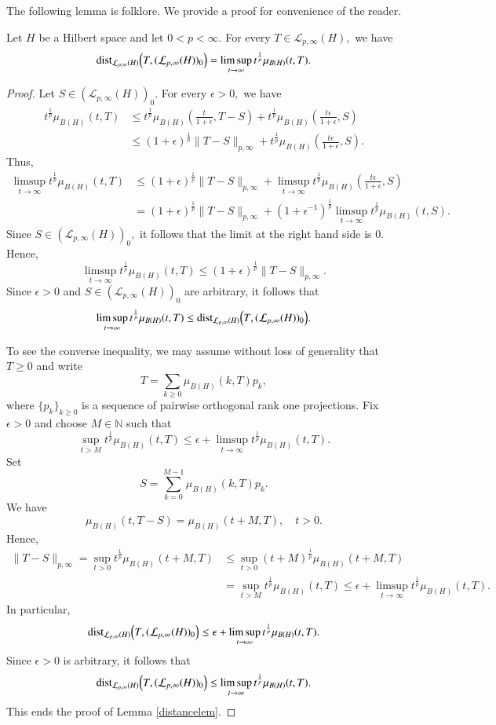 \documentclass[12pt]{amsart}
\begin{document}
{\color{blue} The following lemma is folklore. We provide a proof for convenience of the reader.

\begin{lemma}\label{distancelem}
Let $H$ be a Hilbert space and let $0<p<\infty.$ For every $T\in \mathcal{L}_{p,\infty}(H),$ we have
$${\rm dist}_{\mathcal{L}_{p,\infty}(H)}\Big(T,(\mathcal{L}_{p,\infty}(H))_0\Big)=\limsup_{t\to\infty}t^{\frac1{p}}\mu_{B(H)}(t,T).$$
\end{lemma}
\begin{proof} Let $S\in(\mathcal{L}_{p,\infty}(H))_0.$ For every $\epsilon>0,$ we have
\begin{align*}
t^{\frac1p}\mu_{B(H)}(t,T)&\leq t^{\frac1p}\mu_{B(H)}(\frac{t}{1+\epsilon},T-S)+t^{\frac1p}\mu_{B(H)}(\frac{t\epsilon}{1+\epsilon},S)\\
&\leq(1+\epsilon)^{\frac1p}\|T-S\|_{p,\infty}+t^{\frac1p}\mu_{B(H)}(\frac{t\epsilon}{1+\epsilon},S).
\end{align*}
Thus,
\begin{align*}
\limsup_{t\to\infty}t^{\frac1{p}}\mu_{B(H)}(t,T)&\leq (1+\epsilon)^{\frac1p}\|T-S\|_{p,\infty}+\limsup_{t\to\infty}t^{\frac1p}\mu_{B(H)}(\frac{t\epsilon}{1+\epsilon},S)\\
&=(1+\epsilon)^{\frac1p}\|T-S\|_{p,\infty}+(1+\epsilon^{-1})^{\frac1p}\limsup_{t\to\infty}t^{\frac1p}\mu_{B(H)}(t,S).
\end{align*}
Since $S\in (\mathcal{L}_{p,\infty}(H))_0,$ it follows that the limit at the right hand side is $0.$ Hence,
$$\limsup_{t\to\infty}t^{\frac1{p}}\mu_{B(H)}(t,T)\leq(1+\epsilon)^{\frac1p}\|T-S\|_{p,\infty}.$$
Since $\epsilon>0$ and $S\in (\mathcal{L}_{p,\infty}(H))_0$ are arbitrary, it follows that
$$\limsup_{t\to\infty}t^{\frac1{p}}\mu_{B(H)}(t,T)\leq {\rm dist}_{\mathcal{L}_{p,\infty}(H)}\Big(T,(\mathcal{L}_{p,\infty}(H))_0\Big).$$

To see the converse inequality, we may assume without loss of generality that $T\geq0$ and write
$$T=\sum_{k\geq0}\mu_{B(H)}(k,T)p_k,$$
where $\{p_k\}_{k\geq0}$ is a sequence of pairwise orthogonal rank one projections. Fix $\epsilon>0$ and choose $M\in\mathbb{N}$ such that
$$\sup_{t>M}t^{\frac1p}\mu_{B(H)}(t,T)\leq\epsilon+\limsup_{t\to\infty}t^{\frac1{p}}\mu_{B(H)}(t,T).$$
Set
$$S=\sum_{k=0}^{M-1}\mu_{B(H)}(k,T)p_k.$$
We have
$$\mu_{B(H)}(t,T-S)=\mu_{B(H)}(t+M,T),\quad t>0.$$
Hence,
\begin{align*}
\|T-S\|_{p,\infty}=\sup_{t>0}t^{\frac1p}\mu_{B(H)}(t+M,T)&\leq \sup_{t>0}(t+M)^{\frac1p}\mu_{B(H)}(t+M,T)\\
&=\sup_{t>M}t^{\frac1p}\mu_{B(H)}(t,T)\leq\epsilon+\limsup_{t\to\infty}t^{\frac1{p}}\mu_{B(H)}(t,T).
\end{align*}
In particular,
$${\rm dist}_{\mathcal{L}_{p,\infty}(H)}\Big(T,(\mathcal{L}_{p,\infty}(H))_0\Big)\leq \epsilon+\limsup_{t\to\infty}t^{\frac1{p}}\mu_{B(H)}(t,T).$$
Since $\epsilon>0$ is arbitrary, it follows that
$${\rm dist}_{\mathcal{L}_{p,\infty}(H)}\Big(T,(\mathcal{L}_{p,\infty}(H))_0\Big)\leq\limsup_{t\to\infty}t^{\frac1{p}}\mu_{B(H)}(t,T).$$
This ends the proof of Lemma \ref{distancelem}.
\end{proof}
}
\end{document}
